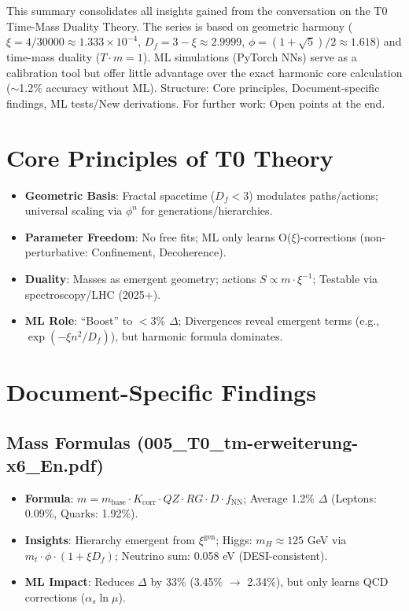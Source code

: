 This summary consolidates all insights gained from the conversation on the T0 Time-Mass Duality Theory. The series is based on geometric harmony ($\xi = 4/30000 \approx 1.333\times10^{-4}$, $D_f = 3 - \xi \approx 2.9999$, $\phi = (1+\sqrt{5})/2 \approx 1.618$) and time-mass duality ($T \cdot m = 1$). ML simulations (PyTorch NNs) serve as a calibration tool but offer little advantage over the exact harmonic core calculation ($\sim$1.2\% accuracy without ML). Structure: Core principles, Document-specific findings, ML tests/New derivations. For further work: Open points at the end.
	
	\section{Core Principles of T0 Theory}
	
	\begin{itemize}
		\item \textbf{Geometric Basis}: Fractal spacetime ($D_f < 3$) modulates paths/actions; universal scaling via $\phi^n$ for generations/hierarchies.
		\item \textbf{Parameter Freedom}: No free fits; ML only learns O($\xi$)-corrections (non-perturbative: Confinement, Decoherence).
		\item \textbf{Duality}: Masses as emergent geometry; actions $S \propto m \cdot \xi^{-1}$; Testable via spectroscopy/LHC (2025+).
		\item \textbf{ML Role}: ``Boost'' to $<$3\% $\Delta$; Divergences reveal emergent terms (e.g., $\exp(-\xi n^2 / D_f)$), but harmonic formula dominates.
	\end{itemize}
	
	\section{Document-Specific Findings}
	
	\subsection{Mass Formulas (005\_T0\_tm-erweiterung-x6\_En.pdf)}
	
	\begin{itemize}
		\item \textbf{Formula}: $m = m_\text{base} \cdot K_\text{corr} \cdot QZ \cdot RG \cdot D \cdot f_\text{NN}$; Average 1.2\% $\Delta$ (Leptons: 0.09\%, Quarks: 1.92\%).
		\item \textbf{Insights}: Hierarchy emergent from $\xi^\text{gen}$; Higgs: $m_H \approx 125$ GeV via $m_t \cdot \phi \cdot (1 + \xi D_f)$; Neutrino sum: 0.058 eV (DESI-consistent).
		\item \textbf{ML Impact}: Reduces $\Delta$ by 33\% (3.45\% $\to$ 2.34\%), but only learns QCD corrections ($\alpha_s \ln \mu$).
	\end{itemize}
	
